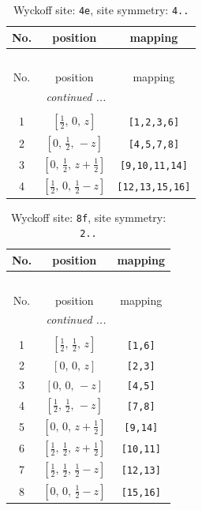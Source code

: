 \documentclass[fleqn,8pt]{jsarticle}
\begin{document}
\renewcommand{\arraystretch}{1.2}
\begin{longtable}{ccc}
\caption{Wyckoff site: {\tt 4e}, site symmetry: {\tt 4..}}
 \\
 \hline \hline
No. & position & mapping \\ \hline \endfirsthead

\multicolumn{2}{l}{\tablename\ \thetable{}} \\
 \hline \hline
No. & position & mapping \\ \hline \endhead

 \hline \hline
\multicolumn{2}{r}{\footnotesize\it continued ...} \\ \endfoot

 \hline \hline
\multicolumn{2}{r}{} \\ \endlastfoot

1 & $\left[ \frac{1}{2},\, 0,\, z \right]$ & {\tt [1,2,3,6]} \\ \hline
2 & $\left[ 0,\, \frac{1}{2},\, - z \right]$ & {\tt [4,5,7,8]} \\ \hline
3 & $\left[ 0,\, \frac{1}{2},\, z + \frac{1}{2} \right]$ & {\tt [9,10,11,14]} \\ \hline
4 & $\left[ \frac{1}{2},\, 0,\, \frac{1}{2} - z \right]$ & {\tt [12,13,15,16]} \\
\end{longtable}
\renewcommand{\arraystretch}{1.2}
\begin{longtable}{ccc}
\caption{Wyckoff site: {\tt 8f}, site symmetry: {\tt 2..}}
 \\
 \hline \hline
No. & position & mapping \\ \hline \endfirsthead

\multicolumn{2}{l}{\tablename\ \thetable{}} \\
 \hline \hline
No. & position & mapping \\ \hline \endhead

 \hline \hline
\multicolumn{2}{r}{\footnotesize\it continued ...} \\ \endfoot

 \hline \hline
\multicolumn{2}{r}{} \\ \endlastfoot

1 & $\left[ \frac{1}{2},\, \frac{1}{2},\, z \right]$ & {\tt [1,6]} \\ \hline
2 & $\left[ 0,\, 0,\, z \right]$ & {\tt [2,3]} \\ \hline
3 & $\left[ 0,\, 0,\, - z \right]$ & {\tt [4,5]} \\ \hline
4 & $\left[ \frac{1}{2},\, \frac{1}{2},\, - z \right]$ & {\tt [7,8]} \\ \hline
5 & $\left[ 0,\, 0,\, z + \frac{1}{2} \right]$ & {\tt [9,14]} \\ \hline
6 & $\left[ \frac{1}{2},\, \frac{1}{2},\, z + \frac{1}{2} \right]$ & {\tt [10,11]} \\ \hline
7 & $\left[ \frac{1}{2},\, \frac{1}{2},\, \frac{1}{2} - z \right]$ & {\tt [12,13]} \\ \hline
8 & $\left[ 0,\, 0,\, \frac{1}{2} - z \right]$ & {\tt [15,16]} \\
\end{longtable}
\end{document}
